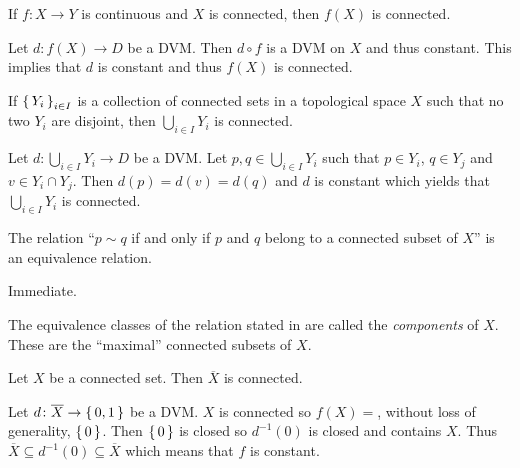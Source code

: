 \documentclass[letterpaper, 11pt, oneside]{book}
\begin{document}
\begin{prop}\label{prop: image_of_connected_is_connected}
  If $f\colon X \to Y$ is continuous and $X$ is connected, then $f(X)$ is connected.
\end{prop}
\begin{pf}
  Let $d\colon f(X) \to D$ be a DVM.\@
  Then $d \circ f$ is a DVM on $X$ and thus constant.
  This implies that $d$ is constant and thus $f(X)$ is connected.
\end{pf}

\begin{prop}
  If $\set{Y_{i}}_{i \in I}$ is a collection of connected sets in a topological space $X$ such that no two $Y_{i}$ are disjoint, then $\bigcup_{i \in I} Y_{i}$ is connected.
\end{prop}
\begin{pf}
  Let $d\colon \bigcup_{i \in I} Y_{i} \to D$ be a DVM.\@
  Let $p, q \in \bigcup_{i \in I} Y_{i}$ such that $p \in Y_{i}$, $q \in Y_{j}$ and $v \in Y_{i} \cap Y_{j}$.
  Then $d(p) = d(v) = d(q)$ and $d$ is constant which yields that $\bigcup_{i \in I} Y_{i}$ is connected.
\end{pf}

\begin{cor}\label{cor: connected_subset_eq}
  The relation ``$p \sim q$ if and only if $p$ and $q$ belong to a connected subset of $X$'' is an equivalence relation.
\end{cor}
\begin{pf}
  Immediate.
\end{pf}

\begin{defn}[Components]
  The equivalence classes of the relation stated in  are called the \emph{components} of $X$.
  These are the ``maximal'' connected subsets of $X$.
\end{defn}


\begin{lem}\label{lem: closure_of_connected_is_connected}
  Let $X$ be a connected set.
  Then $\overline{X}$ is connected.
\end{lem}
\begin{pf}
  Let $d\colon \overline{X} \to \set{0, 1}$ be a DVM.\@
  $X$ is connected so $f(X) =$, without loss of generality, $\set{0}$.
  Then $\set{0}$ is closed so $d^{-1}(0)$ is closed and contains $X$.
  Thus $\overline{X} \subseteq d^{-1}(0) \subseteq \overline{X}$ which means that $f$ is constant.
\end{pf}
\end{document}
